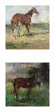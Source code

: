 \documentclass[a4paper]{article}
\begin{document}
\begin{figure}[!h]
\begin{minipage}[ht]{0.5\textwidth}
\begin{subfigure}[b]{0.2\textwidth}
        \includegraphics[width=\textwidth]{horse_3.jpg}
    \end{subfigure}
    \begin{subfigure}[b]{0.2\textwidth}
        \includegraphics[width=\textwidth]{horse_4.jpg}
    \end{subfigure}
  \end{minipage}
\end{figure}
\end{document}
